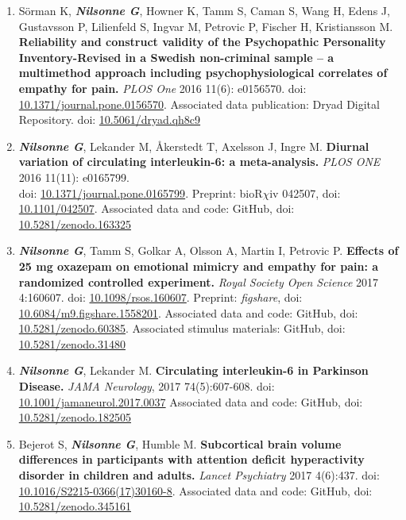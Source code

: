 \documentclass[10pt]{article}
\begin{document}
\begin{enumerate}[nolistsep]
doi: \href{http://dx.doi.org/10.1098/rsos.160049}{10.1098/rsos.160049}.
Associated data and code: GitHub, doi: \href{http://dx.doi.org/10.5281/zenodo.12984}{10.5281/zenodo.12984}
\label{ballot beauty}
\item Sörman K, \textbf{\textit{Nilsonne G}}, Howner K, Tamm S, Caman S, Wang H, Edens J, Gustavsson P, Lilienfeld S, Ingvar M, Petrovic P, Fischer H, Kristiansson M. \textbf{Reliability and construct validity of the Psychopathic Personality Inventory-Revised in a Swedish non-criminal sample – a multimethod approach including psychophysiological correlates of empathy for pain.} \emph{PLOS One} 2016 11(6): e0156570.
doi: \href{http://dx.doi.org/10.1371/journal.pone.0156570}{10.1371/journal.pone.0156570}.
Associated data publication: Dryad Digital Repository. doi: \href{http://dx.doi.org/10.5061/dryad.qh8c9}{10.5061/dryad.qh8c9}
\item \textbf{\textit{Nilsonne G}}, Lekander M, Åkerstedt T, Axelsson J, Ingre M. \textbf{Diurnal variation of circulating interleukin-6: a meta-analysis.} \emph{PLOS ONE} 2016 11(11): e0165799.\\
doi: \href{http://dx.doi.org/10.1371/journal.pone.0165799}{10.1371/journal.pone.0165799}.
Preprint: bioR$\chi$iv 042507, doi: \href{http://dx.doi.org/10.1101/042507}{10.1101/042507}.
Associated data and code: GitHub, doi: \href{http://dx.doi.org/10.5281/zenodo.163325}{10.5281/zenodo.163325}
\item \textbf{\textit{Nilsonne G}}, Tamm S, Golkar A, Olsson A, Martin I, Petrovic P. \textbf{Effects of 25 mg oxazepam on emotional mimicry and empathy for pain: a randomized controlled experiment.} \textit{Royal Society Open Science} 2017 4:160607.
doi: \href{http://dx.doi.org/10.1098/rsos.160607}{10.1098/rsos.160607}.
Preprint: \emph{figshare}, doi: \href{http://dx.doi.org/10.6084/m9.figshare.1558201}{10.6084/m9.figshare.1558201}.
Associated data and code: GitHub, doi: \href{http://dx.doi.org/10.5281/zenodo.60385}{10.5281/zenodo.60385}.
Associated stimulus materials: GitHub, doi: \href{http://dx.doi.org/10.5281/zenodo.31480}{10.5281/zenodo.31480}
\item \textbf{\textit{Nilsonne G}}, Lekander M. \textbf{Circulating interleukin-6 in Parkinson Disease.} \emph{JAMA Neurology}, 2017 74(5):607-608. doi: \href{http://dx.doi.org/10.1001/jamaneurol.2017.0037}{10.1001/jamaneurol.2017.0037}
Associated data and code: GitHub, doi: \href{http://dx.doi.org/10.5281/zenodo.182505}{10.5281/zenodo.182505}
\item Bejerot S, \textbf{\textit{Nilsonne G}}, Humble M. \textbf{Subcortical brain volume differences in participants with attention deficit hyperactivity disorder in children and adults.} \emph{Lancet Psychiatry} 2017 4(6):437. doi: \href{http://dx.doi.org/10.1016/S2215-0366(17)30160-8}{10.1016/S2215-0366(17)30160-8}. Associated data and code: GitHub, doi: \href{http://dx.doi.org/10.5281/zenodo.345161}{10.5281/zenodo.345161}

\end{enumerate}
\end{document}
